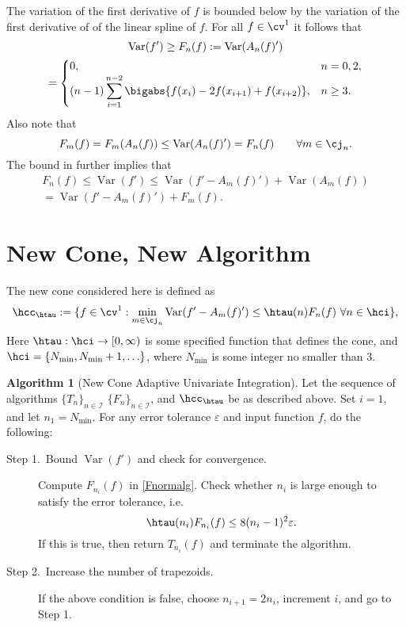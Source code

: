 \documentclass[]{elsarticle}
\DeclareMathOperator{\Var}{Var}
\theoremstyle{definition}
\newtheorem{algo}{Algorithm}
\theoremstyle{remark}
\begin{document}
The variation of the first derivative of $f$ is bounded below by the variation of the first derivative of of the linear spline of $f$.  For all $f \in \cv^1$ it follows that
\begin{multline} 
\Var(f') \ge F_n(f) :=\Var(A_n(f)') \\
 = \begin{cases} 0, & n=0,2, \\
\displaystyle (n-1)\sum_{i=1}^{n-2} \bigabs{f(x_{i}) - 2 f(x_{i+1})+f(x_{i+2})}, 
& n\ge 3. 
\end{cases}
\label{Fnormalg}
\end{multline}
Also note that
\begin{equation} \label{Fnbounda}
F_m(f) = F_m(A_n(f)) \le \Var(A_n(f)') = F_n(f) \qquad \forall m \in \cj_n.
\end{equation}
The bound in  further implies that 
\begin{multline} \label{Fnboundb}
F_n(f) \le \Var(f')  \le \Var(f'-A_m(f)') + \Var(A_m(f)) \\
= \Var(f'-A_m(f)') + F_m(f).
\end{multline}


\section{New Cone, New Algorithm}
The new cone considered here is defined as
\begin{equation} \label{Fcone}
\hcc_{\htau}:= \{ f \in \cv^1 :  \min_{m \in \cj_n} \Var(f'-A_m(f)') \le \htau(n) F_n(f) \ \forall n \in \hci \},
\end{equation}
Here $\htau : \hci \to [0,\infty)$ is some specified function that defines the cone, and $\hci=\{N_{\min}, N_{\min}+1, \ldots \}$, where $N_{\min}$ is some integer no smaller than $3$.  
\begin{algo}[New Cone Adaptive Univariate Integration] \label{newconealgo}
Let the sequence of algorithms $\{T_n\}_{n\in \mathcal{I}}$ $\{F_n\}_{n\in \mathcal{I}}$, and $\hcc_{\htau}$ be as described above.  Set $i=1$, and let $n_1=N_{\min}$. For any error tolerance $\varepsilon$ and input function $f$, do the following:
\begin{description}
\item[Step 1.\ Bound {$\Var(f')$} and check for convergence.] Compute $F_{n_i}(f)$ in \eqref{Fnormalg}.  Check whether $n_i$ is large enough to satisfy the error tolerance, i.e.
    \begin{equation*}
      \htau(n_i) F_{n_i}(f) \le 8 (n_i-1)^2 \varepsilon.
    \end{equation*}
If this is true, then return $T_{n_i}(f)$ and terminate the algorithm.   

\item[Step 2.\ Increase the number of trapezoids.]  If the above condition is false, choose $n_{i+1}=2n_i$, increment $i$, and go to Step 1.
\end{description}
\end{algo}
\end{document}
